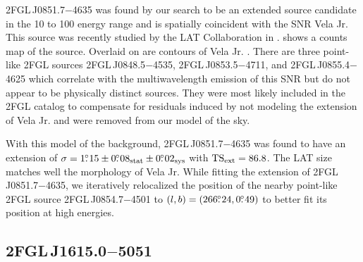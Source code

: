 2FGL\,J0851.7$-$4635 was found by our search to be an extended source
candidate in the 10 \gev to 100 \gev energy range and is spatially
coincident with the SNR Vela Jr. This source was recently studied by the LAT
Collaboration in \cite{tanaka_2011a_gamma-ray-observations}.   shows a counts
map of the source.  Overlaid on  are \tev
contours of Vela Jr. \citep{aharonian_2007a_h.e.s.s.-observations}.
There are three
point-like 2FGL sources 2FGL\,J0848.5$-$4535,
2FGL\,J0853.5$-$4711, and
2FGL\,J0855.4$-$4625
which correlate with the 
multiwavelength
emission of
this SNR but do not appear to be physically distinct sources.
They were most likely included in the 2FGL catalog to compensate for residuals
induced by not modeling the extension of Vela Jr. and were removed
from our model of the sky.  

With this model of the background, 2FGL\,J0851.7$-$4635 was found to
have an extension of $\sigma=1\mbox{$.\!\!^\circ$}15\pm0\mbox{$.\!\!^\circ$}08_\text{stat}\pm0\mbox{$.\!\!^\circ$}02_\text{sys}$ with
$\mathrm{TS}_\mathrm{ext}=86.8$.  The LAT size matches
well the \tev morphology of Vela Jr.  While fitting the extension
of 2FGL\,J0851.7$-$4635, we iteratively relocalized the position
of the nearby point-like 2FGL source 2FGL\,J0854.7$-$4501 to
$(l,b)=(266\mbox{$.\!\!^\circ$}24,0\mbox{$.\!\!^\circ$}49)$ to better fit its position at high energies.
    



\subsection{2FGL\,J1615.0$-$5051}

